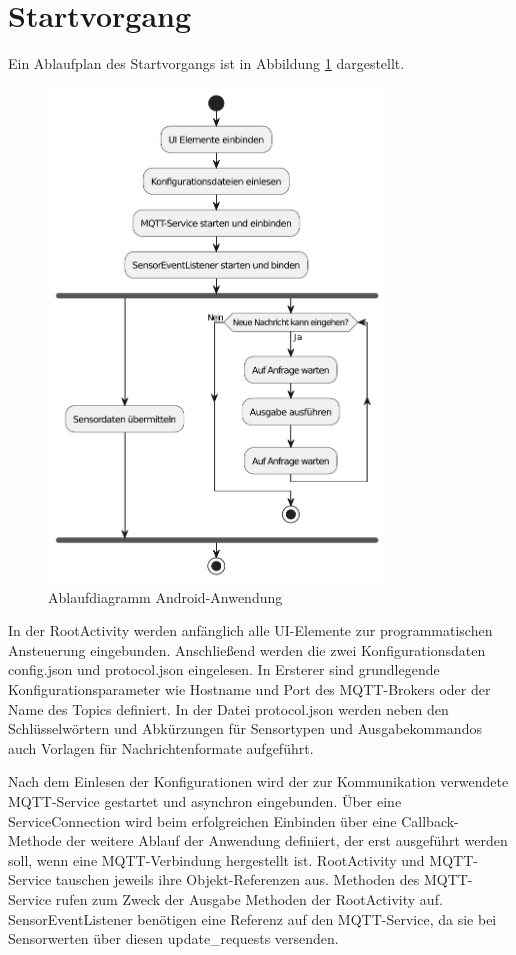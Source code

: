 \documentclass[11pt,a4paper]{report}
\begin{document}
\section{Startvorgang}
Ein Ablaufplan des Startvorgangs ist in Abbildung \ref{fig:app_flow} dargestellt.
\begin{figure}[htbp]
  \centering
  \includegraphics[width=0.8\textwidth]{images/app_ablauf}
  \caption{Ablaufdiagramm Android-Anwendung}
  \label{fig:app_flow}
\end{figure}
In der RootActivity werden anfänglich alle UI-Elemente zur programmatischen Ansteuerung eingebunden.
Anschließend werden die zwei Konfigurationsdaten config.json und protocol.json eingelesen.
In Ersterer sind grundlegende Konfigurationsparameter wie Hostname und Port des MQTT-Brokers oder der Name des Topics definiert.
In der Datei protocol.json werden neben den Schlüsselwörtern und Abkürzungen für Sensortypen und Ausgabekommandos auch Vorlagen für Nachrichtenformate aufgeführt.

Nach dem Einlesen der Konfigurationen wird der zur Kommunikation verwendete MQTT-Service gestartet und asynchron eingebunden.
Über eine ServiceConnection wird beim erfolgreichen Einbinden über eine Callback-Methode der weitere Ablauf der Anwendung definiert, der erst ausgeführt werden soll, wenn eine MQTT-Verbindung hergestellt ist.
RootActivity und MQTT-Service tauschen jeweils ihre Objekt-Referenzen aus.
Methoden des MQTT-Service rufen zum Zweck der Ausgabe Methoden der RootActivity auf.
SensorEventListener benötigen eine Referenz auf den MQTT-Service, da sie bei Sensorwerten über diesen update\_requests versenden.
\end{document}
